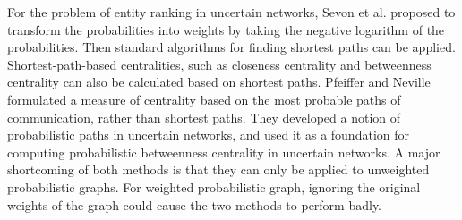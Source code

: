 \documentclass[\main/thesis.tex]{subfiles}
\begin{document}
For the problem of entity ranking in uncertain networks, Sevon et al. \cite{sevon2006link} proposed to transform the probabilities into weights by taking the negative logarithm of the probabilities. Then standard algorithms for finding shortest paths can be applied. Shortest-path-based centralities, such as closeness centrality and betweenness centrality can also be calculated based on shortest paths. Pfeiffer and Neville \cite{pfeiffer2010probabilistic} formulated a measure of centrality based on the most probable paths of communication, rather than shortest paths. They developed a notion of probabilistic paths in uncertain networks, and used it as a foundation for computing probabilistic betweenness centrality in uncertain networks. A major shortcoming of both methods is that they can only be applied to unweighted probabilistic graphs. For weighted probabilistic graph, ignoring the original weights of the graph could cause the two methods to perform badly.
\end{document}
